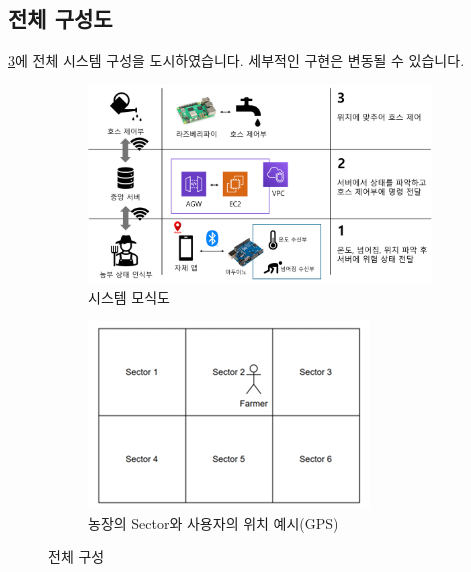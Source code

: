 \documentclass[12pt]{article}
\begin{document}
        \subsection{전체 구성도}
            \cref{dia}에 전체 시스템 구성을 도시하였습니다. 세부적인 구현은 변동될 수 있습니다.
            \begin{figure}[H]
                \centering
                    \begin{subfigure}{.6\textwidth}
                        \centering
                        \includegraphics[width=\linewidth]{diagram.png}
                        \caption{시스템 모식도}
                        \label{dia1}
                    \end{subfigure}
                    \hfill
                    \begin{subfigure}{.3\textwidth}
                        \centering
                        \includegraphics[width=\linewidth]{user.png}
                        \caption{농장의 Sector와 사용자의 위치 예시(GPS)}
                        \label{dia2}
                    \end{subfigure}
                \caption{전체 구성}
                \label{dia}
            \end{figure}
        \newpage
\end{document}
